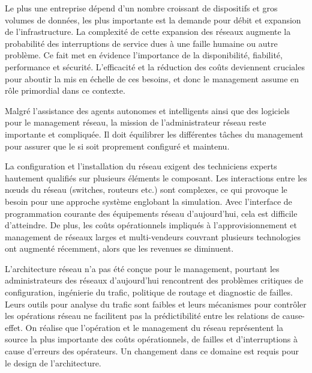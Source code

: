 
\clearpage

Le plus une entreprise dépend d'un nombre croissant de dispositifs et gros volumes de données, les plus importante est la demande pour débit et expansion de l'infrastructure. La complexité de cette expansion des réseaux augmente la probabilité des interruptions de service dues à une faille humaine ou autre problème. Ce fait met en évidence l'importance de la disponibilité, fiabilité, performance et sécurité. L'efficacité et la réduction des coûts deviennent cruciales pour aboutir la mis en échelle de ces besoins, et donc le management assume en rôle primordial dans ce contexte. \cite{IBMManagingGrowingPainsNeed}
 

Malgré l'assistance des agents autonomes et intelligents ainsi que des logiciels pour le management réseau, la mission de l'administrateur réseau reste importante et compliquée. Il doit équilibrer les différentes tâches du management pour assurer que le \gls{si} soit proprement configuré et maintenu. \cite{CentralIssuesNetworkManagementConclusion}

La configuration et l'installation du réseau exigent des techniciens experts hautement qualifiés sur plusieurs éléments le composant. Les interactions entre les nœuds du réseau (switches, routeurs etc.) sont complexes, ce qui provoque le besoin pour une approche système englobant la simulation. Avec l'interface de programmation courante des équipements réseau d'aujourd'hui, cela est difficile d'atteindre. De plus, les coûts opérationnels impliqués à l'approvisionnement et management de réseaux larges et multi-vendeurs  couvrant plusieurs technologies ont augmenté récemment, alors que les revenues se diminuent. \cite{ImplementationChallengesForSDN}

L'architecture réseau n'a pas été conçue pour le management, pourtant les administrateurs des réseaux d'aujourd'hui rencontrent des problèmes critiques de configuration, ingénierie du trafic, politique de routage et diagnostic de failles. Leurs outils pour analyse du trafic sont faibles et leurs mécanismes pour contrôler les opérations réseau ne facilitent pas la prédictibilité entre les relations de cause-effet. On réalise que l'opération et le management du réseau représentent la source la plus importante des coûts opérationnels, de failles et d'interruptions à cause d'erreurs des opérateurs. Un changement dans ce domaine est requis pour le design de l'architecture. \cite{NGSIManagement}


